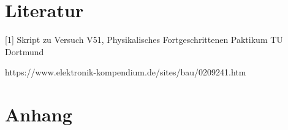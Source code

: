 \documentclass{scrartcl}
\begin{document}
\begin{itemize}
\end{itemize}


\section{Literatur}

[1] Skript zu Versuch V51, Physikalisches Fortgeschrittenen Paktikum TU Dortmund

\noindent
[2] https://www.elektronik-kompendium.de/sites/bau/0209241.htm


\section{Anhang}
\end{document}
